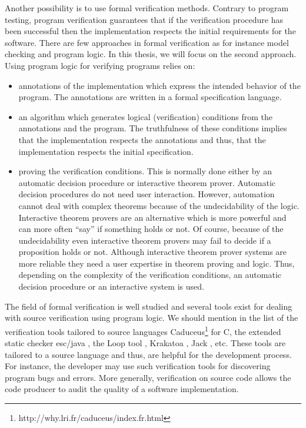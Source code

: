  Another possibility is to use formal verification methods. 
Contrary to program testing,  program verification guarantees that if the verification procedure  
has been successful then the implementation respects the initial requirements for the software. There are few approaches 
in formal verification as for instance model checking and program logic. In this thesis, we will focus on the second approach. 
Using program logic for verifying programs  relies on:
\begin{itemize} 
   \item annotations of the implementation which express the intended behavior of the program. The annotations
         are written in a formal specification language. 
   \item an algorithm which  generates logical (verification) conditions  from the annotations and the program. 
         The truthfulness of these conditions implies that the implementation respects the annotations and thus,
	 that the implementation respects the initial specification. 
    
   \item proving the verification conditions. This is normally done either by an automatic decision 
         procedure or interactive theorem prover.
         Automatic decision procedures do not need user interaction.
         However, automation cannot deal with complex theorems because of the 
	  undecidability of the logic.
	 Interactive theorem provers are an alternative which is 
	 more powerful and can more often ``say'' if something holds or not. Of course, because of the undecidability 
	 even  interactive theorem provers may fail to decide if a proposition holds or not. Although interactive theorem prover
	 systems are more reliable they need a user expertise in theorem proving and logic. 
	 Thus, depending on the complexity of the verification conditions, an automatic decision procedure or an interactive system is used.

           
\end{itemize}

 The field of formal  verification is well studied and several  tools exist for
dealing with  source verification using program logic. We should mention in the list of the verification tools tailored to source languages
 Caduceus\footnote{http://why.lri.fr/caduceus/index.fr.html} for C,  the extended static checker
esc/java \cite{escjava}, the Loop tool \cite{jacobs03java},
Krakatoa \cite{marche03krakatoa}, Jack \cite{BRL-JACK}, etc. These tools are tailored to a source language and thus,
 are helpful for the development process. For instance, the developer may use such verification tools for discovering program bugs and
 errors. More generally, verification on source code allows the code producer to audit the quality of a software implementation.
 
